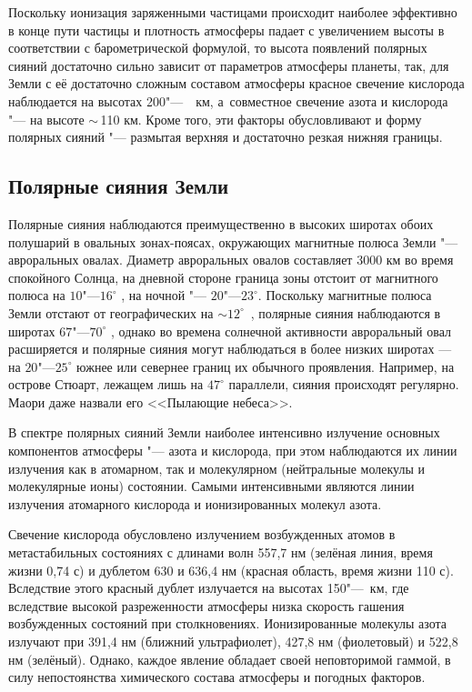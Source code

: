 \documentclass[a4paper,14pt]{article}
\theoremstyle{plain} %
\theoremstyle{definition} %
\theoremstyle{remark} %
\begin{document}
Поскольку ионизация заряженными частицами происходит наиболее
эффективно в конце пути частицы и плотность атмосферы падает с увеличением высоты в соответствии с барометрической формулой, то высота
появлений полярных сияний достаточно сильно зависит от параметров
атмосферы планеты, так, для Земли с её достаточно сложным составом
атмосферы красное свечение кислорода наблюдается на высотах 200"---~\ км, а~совместное свечение азота и кислорода "--- на высоте $\sim$\,110 км.
Кроме того, эти факторы обусловливают и форму полярных сияний "---
размытая верхняя и достаточно резкая нижняя границы.

\subsection{Полярные сияния Земли}

Полярные сияния наблюдаются преимущественно в высоких широтах
обоих полушарий в овальных зонах-поясах, окружающих магнитные полюса Земли "--- авроральных овалах. Диаметр авроральных овалов составляет 3000 км во время спокойного Солнца, на дневной стороне граница
зоны отстоит от магнитного полюса на $10\text{"---}\!16^\circ$
, на ночной "--- $20\text{"---}\!23^\circ$. Поскольку магнитные полюса Земли отстают от географических на $\sim 12^\circ$~,
полярные сияния наблюдаются в широтах $67\text{"---}\!70^\circ$
, однако во времена
солнечной активности авроральный овал расширяется и полярные сияния могут наблюдаться в более низких широтах — на $20\text{"---}\!25^\circ$ южнее или
севернее границ их обычного проявления. Например, на острове Стюарт,
лежащем лишь на $47^\circ$ параллели, сияния происходят регулярно. Маори
даже назвали его <<Пылающие небеса>>.

В спектре полярных сияний Земли наиболее интенсивно излучение
основных компонентов атмосферы "--- азота и кислорода, при этом наблюдаются их линии излучения как в атомарном, так и молекулярном (нейтральные молекулы и молекулярные ионы) состоянии. Самыми интенсивными являются линии излучения атомарного кислорода и ионизированных молекул азота.

Свечение кислорода обусловлено излучением возбужденных атомов в метастабильных состояниях с длинами волн 557,7 нм (зелёная линия,
время жизни 0,74 с) и дублетом 630 и 636,4 нм (красная область, время
жизни 110 с). Вследствие этого красный дублет излучается на высотах
150"---~км, где вследствие высокой разреженности атмосферы низка
скорость гашения возбужденных состояний при столкновениях. Ионизированные молекулы азота излучают при 391,4 нм (ближний ультрафиолет), 427,8 нм (фиолетовый) и 522,8 нм (зелёный). Однако, каждое
явление обладает своей неповторимой гаммой, в силу непостоянства химического состава атмосферы и погодных факторов.
\end{document}
